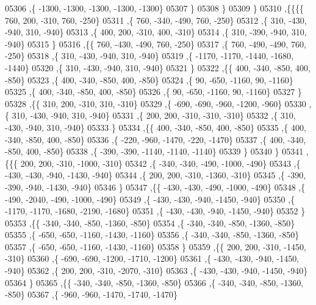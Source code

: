 \begin{DoxyCode}
05306     ,\{ -1300, -1300, -1300, -1300, -1300\}
05307     \}
05308    \}
05309   \}
05310  ,\{\{\{\{   760,   200,  -310,   760,  -250\}
05311     ,\{   760,  -340,  -490,   760,  -250\}
05312     ,\{   310,  -430,  -940,   310,  -940\}
05313     ,\{   400,   200,  -310,   400,  -310\}
05314     ,\{   310,  -390,  -940,   310,  -940\}
05315     \}
05316    ,\{\{   760,  -430,  -490,   760,  -250\}
05317     ,\{   760,  -490,  -490,   760,  -250\}
05318     ,\{   310,  -430,  -940,   310,  -940\}
05319     ,\{ -1170, -1170, -1440, -1680, -1440\}
05320     ,\{   310,  -430,  -940,   310,  -940\}
05321     \}
05322    ,\{\{   400,  -340,  -850,   400,  -850\}
05323     ,\{   400,  -340,  -850,   400,  -850\}
05324     ,\{    90,  -650, -1160,    90, -1160\}
05325     ,\{   400,  -340,  -850,   400,  -850\}
05326     ,\{    90,  -650, -1160,    90, -1160\}
05327     \}
05328    ,\{\{   310,   200,  -310,   310,  -310\}
05329     ,\{  -690,  -690,  -960, -1200,  -960\}
05330     ,\{   310,  -430,  -940,   310,  -940\}
05331     ,\{   200,   200,  -310,  -310,  -310\}
05332     ,\{   310,  -430,  -940,   310,  -940\}
05333     \}
05334    ,\{\{   400,  -340,  -850,   400,  -850\}
05335     ,\{   400,  -340,  -850,   400,  -850\}
05336     ,\{  -220,  -960, -1470,  -220, -1470\}
05337     ,\{   400,  -340,  -850,   400,  -850\}
05338     ,\{  -390,  -390, -1140, -1140, -1140\}
05339     \}
05340    \}
05341   ,\{\{\{   200,   200,  -310, -1000,  -310\}
05342     ,\{  -340,  -340,  -490, -1000,  -490\}
05343     ,\{  -430,  -430,  -940, -1430,  -940\}
05344     ,\{   200,   200,  -310, -1360,  -310\}
05345     ,\{  -390,  -390,  -940, -1430,  -940\}
05346     \}
05347    ,\{\{  -430,  -430,  -490, -1000,  -490\}
05348     ,\{  -490, -2040,  -490, -1000,  -490\}
05349     ,\{  -430,  -430,  -940, -1450,  -940\}
05350     ,\{ -1170, -1170, -1680, -2190, -1680\}
05351     ,\{  -430,  -430,  -940, -1450,  -940\}
05352     \}
05353    ,\{\{  -340,  -340,  -850, -1360,  -850\}
05354     ,\{  -340,  -340,  -850, -1360,  -850\}
05355     ,\{  -650,  -650, -1160, -1430, -1160\}
05356     ,\{  -340,  -340,  -850, -1360,  -850\}
05357     ,\{  -650,  -650, -1160, -1430, -1160\}
05358     \}
05359    ,\{\{   200,   200,  -310, -1450,  -310\}
05360     ,\{  -690,  -690, -1200, -1710, -1200\}
05361     ,\{  -430,  -430,  -940, -1450,  -940\}
05362     ,\{   200,   200,  -310, -2070,  -310\}
05363     ,\{  -430,  -430,  -940, -1450,  -940\}
05364     \}
05365    ,\{\{  -340,  -340,  -850, -1360,  -850\}
05366     ,\{  -340,  -340,  -850, -1360,  -850\}
05367     ,\{  -960,  -960, -1470, -1740, -1470\}

\end{DoxyCode}
